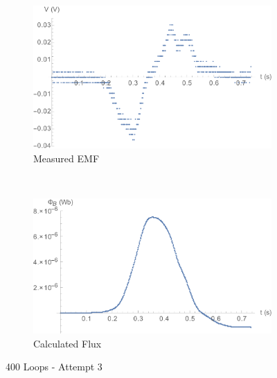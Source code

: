 \documentclass[a4paper]{scrartcl}
\begin{document}
\begin{figure}[p]
    \centering
    \begin{subfigure}[b]{0.45\textwidth}
        \includegraphics[width = \textwidth]{400_3_voltage.png}
        \caption{Measured EMF}
    \end{subfigure}
    ~
    \begin{subfigure}[b]{0.45\textwidth}
        \includegraphics[width = \textwidth]{400_3_flux.png}
        \caption{Calculated Flux}
    \end{subfigure}
    \caption{400 Loops - Attempt 3}
    \label{fig:400_3}
\end{figure}
\end{document}
